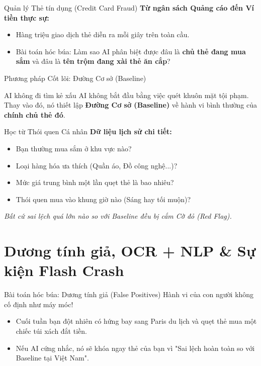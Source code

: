 \documentclass[aspectratio=169]{beamer}
\begin{document}
\begin{frame}{Quản lý Thẻ tín dụng (Credit Card Fraud)}
    \textbf{Từ ngân sách Quảng cáo đến Ví tiền thực sự:}
    \begin{itemize}
        \item Hàng triệu giao dịch thẻ diễn ra mỗi giây trên toàn cầu.
        \item Bài toán hóc búa: Làm sao AI phân biệt được đâu là \textbf{chủ thẻ đang mua sắm} và đâu là \textbf{tên trộm đang xài thẻ ăn cắp}?
    \end{itemize}
\end{frame}

\begin{frame}{Phương pháp Cốt lõi: Đường Cơ sở (Baseline)}
    \begin{alertblock}{AI không đi tìm kẻ xấu}
        AI không bắt đầu bằng việc quét khuôn mặt tội phạm. Thay vào đó, nó thiết lập \textbf{Đường Cơ sở (Baseline)} về hành vi bình thường của \textbf{chính chủ thẻ đó}.
    \end{alertblock}
\end{frame}

\begin{frame}{Học từ Thói quen Cá nhân}
    \textbf{Dữ liệu lịch sử chi tiết:}
    \begin{itemize}
        \item Bạn thường mua sắm ở khu vực nào?
        \item Loại hàng hóa ưa thích (Quần áo, Đồ công nghệ...)?
        \item Mức giá trung bình một lần quẹt thẻ là bao nhiêu?
        \item Thói quen mua vào khung giờ nào (Sáng hay tối muộn)?
    \end{itemize}
    \textit{Bất cứ sai lệch quá lớn nào so với Baseline đều bị cắm Cờ đỏ (Red Flag).}
\end{frame}

\section{Dương tính giả, OCR + NLP \& Sự kiện Flash Crash}

\begin{frame}{Bài toán hóc búa: Dương tính giả (False Positives)}
    Hành vi của con người không cố định như máy móc!
    \begin{itemize}
        \item Cuối tuần bạn đột nhiên có hứng bay sang Paris du lịch và quẹt thẻ mua một chiếc túi xách đắt tiền.
        \item Nếu AI cứng nhắc, nó sẽ khóa ngay thẻ của bạn vì "Sai lệch hoàn toàn so với Baseline tại Việt Nam".
    \end{itemize}
\end{frame}
\end{document}
